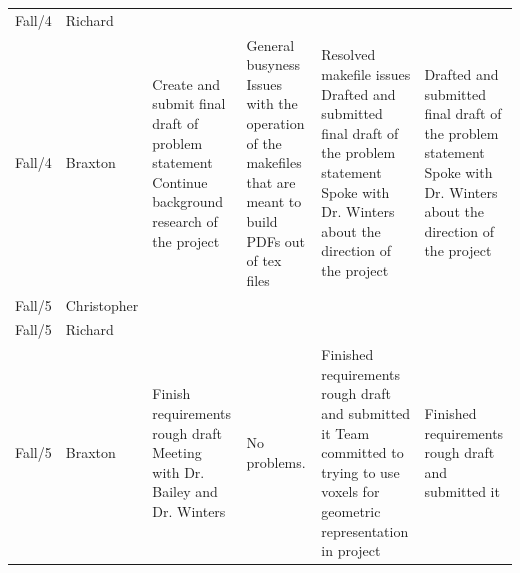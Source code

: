 \documentclass[onecolumn, draftclsnofoot,10pt, compsoc]{IEEEtran}
\begin{document}
\begin{tiny}
\begin{longtable}{ | p{} | p{} | p{} | p{} | p{} | p{} | }
&

&

&

\\ \hline
Fall/4 & Richard & 

&

&

&

\\ \hline
Fall/4 & Braxton & 

Create and submit final draft of problem statement \newline
Continue background research of the project 

&

General busyness  \newline
Issues with the operation of the makefiles that are meant to build PDFs out of tex files 

&

Resolved makefile issues  \newline
Drafted and submitted final draft of the problem statement \newline
Spoke with Dr. Winters about the direction of the project 

&

Drafted and submitted final draft of the problem statement \newline 
Spoke with Dr. Winters about the direction of the project 

\\ \hline
Fall/5 & Christopher & 

&

&

&

\\ \hline
Fall/5 & Richard & 

&

&

&

\\ \hline
Fall/5 & Braxton & 

Finish requirements rough draft 
Meeting with Dr. Bailey and Dr. Winters 

&

No problems.

&

Finished requirements rough draft and submitted it \newline
Team committed to trying to use voxels for geometric representation in project 

&

Finished requirements rough draft and submitted it 


\end{longtable}
\end{tiny}
\end{document}
